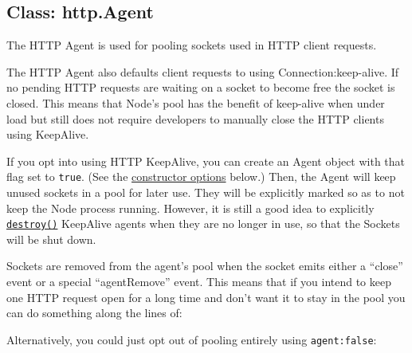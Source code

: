 \subsection{Class: http.Agent}

The HTTP Agent is used for pooling sockets used in HTTP client requests.

The HTTP Agent also defaults client requests to using
Connection:keep-alive. If no pending HTTP requests are waiting on a
socket to become free the socket is closed. This means that Node's pool
has the benefit of keep-alive when under load but still does not require
developers to manually close the HTTP clients using KeepAlive.

If you opt into using HTTP KeepAlive, you can create an Agent object
with that flag set to \texttt{true}. (See the
\hyperref[http\_new\_agent\_options]{constructor options} below.) Then,
the Agent will keep unused sockets in a pool for later use. They will be
explicitly marked so as to not keep the Node process running. However,
it is still a good idea to explicitly
\hyperref[http\_agent\_destroy]{\texttt{destroy()}} KeepAlive agents
when they are no longer in use, so that the Sockets will be shut down.

Sockets are removed from the agent's pool when the socket emits either a
``close'' event or a special ``agentRemove'' event. This means that if
you intend to keep one HTTP request open for a long time and don't want
it to stay in the pool you can do something along the lines of:

\begin{Shaded}
\begin{Highlighting}[]
\NormalTok{(}\NormalTok{, } 
  \NormalTok{(}\NormalTok{);}
\NormalTok{\});}
\end{Highlighting}
\end{Shaded}

Alternatively, you could just opt out of pooling entirely using
\texttt{agent:false}:

\begin{Shaded}
\begin{Highlighting}[]
\NormalTok{(\{}
  \NormalTok{: }\NormalTok{,}
  \NormalTok{: }\NormalTok{,}
  \NormalTok{: }\NormalTok{,}
  \NormalTok{: }  
\NormalTok{\}, } 
\NormalTok{\})}
\end{Highlighting}
\end{Shaded}

